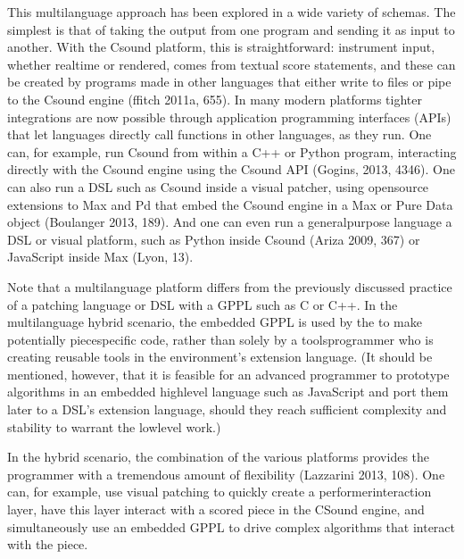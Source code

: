 \documentclass[letterpaper,10pt,english]{sphinxmanual}
\begin{document}
\sphinxAtStartPar
This multi\sphinxhyphen{}language approach has been explored in a wide variety of schemas.
The simplest is that of taking the output from one program
and sending it as input to another. With the Csound platform, this
is straightforward: instrument input, whether real\sphinxhyphen{}time or rendered,
comes from textual score statements, and these can be created by programs
made in other languages that either write to files or pipe to the Csound engine (ffitch 2011a, 655).
In many modern platforms tighter integrations are now possible
through application programming interfaces (APIs) that let languages directly call
functions in other languages, as they run.
One can, for example, run Csound from within a C++ or Python program, interacting
directly with the Csound engine using the Csound API (Gogins, 2013, 43\sphinxhyphen{}46).
One can also run a DSL such as Csound inside a visual patcher, using open\sphinxhyphen{}source
extensions to Max and Pd that embed the Csound engine in a Max or Pure Data object (Boulanger 2013, 189).
And one can even run a general\sphinxhyphen{}purpose language  a DSL or visual platform,
such as Python inside Csound (Ariza 2009, 367)
or JavaScript inside Max (Lyon, 13).

\sphinxAtStartPar
Note that a multi\sphinxhyphen{}language platform differs from the previously discussed practice of
 a patching language or DSL with a GPPL such as C or C++.
In the multi\sphinxhyphen{}language hybrid scenario, the embedded GPPL is used
by the  to make potentially piece\sphinxhyphen{}specific code,
rather than solely by a tools\sphinxhyphen{}programmer who is creating reusable tools in the environment’s extension language.
(It should be mentioned, however, that it is feasible for an advanced programmer
to prototype algorithms in an embedded high\sphinxhyphen{}level language such as
JavaScript and port them later to a DSL’s extension language,
should they reach sufficient complexity and stability to warrant the low\sphinxhyphen{}level work.)

\sphinxAtStartPar
In the hybrid scenario, the combination of the various platforms
provides the programmer with a tremendous amount of flexibility (Lazzarini 2013, 108).
One can, for example, use visual patching to quickly
create a performer\sphinxhyphen{}interaction layer, have this layer interact with
a scored piece in the CSound engine, and simultaneously use an embedded GPPL to
drive complex algorithms that interact with the piece.
\end{document}
